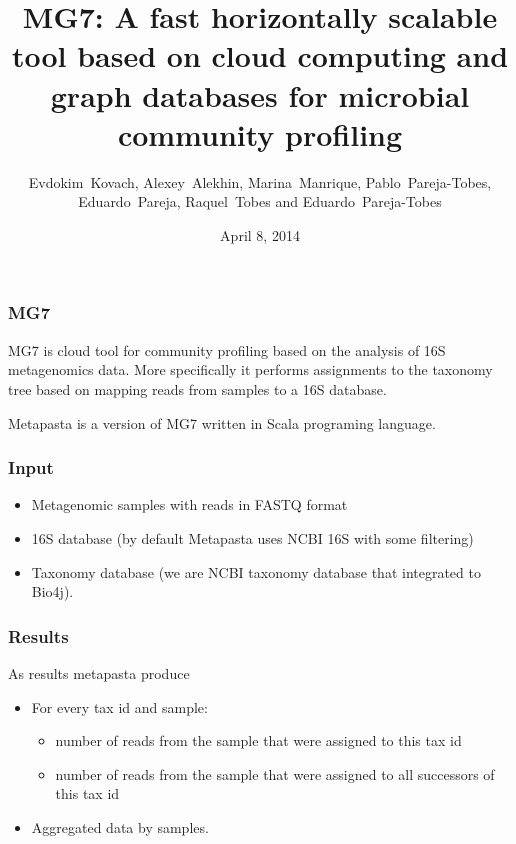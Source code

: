 \documentclass{beamer}
\title[MG7]{MG7: A fast horizontally scalable tool based on
cloud computing and graph databases for
microbial community profiling
} %
\author{Evdokim~Kovach, Alexey~Alekhin, Marina~Manrique, Pablo~Pareja-Tobes, Eduardo~Pareja, Raquel~Tobes and Eduardo~Pareja-Tobes} %
\institute[Era7] %
{
Oh no sequences! Research Group, Era7 bioinformatics
 \\ %
\textit{eparejatobes@ohnosequences.com} %
}
\date{April 8, 2014} %
\begin{document}
\begin{frame}
\titlepage %
\end{frame}



\begin{frame}
\frametitle{MG7}

MG7 is cloud tool for community profiling based on the analysis of 16S metagenomics data.
More specifically it performs assignments to the taxonomy tree based on mapping reads from samples
to a 16S database.

\vspace{1em}

Metapasta is a version of MG7 written in Scala programing language.

\end{frame}

\begin{frame}
\frametitle{Input}
\begin{itemize}
  \item Metagenomic samples with reads in FASTQ format
  \item 16S database (by default Metapasta uses NCBI 16S with some filtering)
  \item Taxonomy database (we are NCBI taxonomy database that integrated to Bio4j).
\end{itemize}
\end{frame}


\begin{frame}
\frametitle{Results}
As results metapasta produce
\begin{itemize}
  \item For every tax id and sample: 
  \begin{itemize}
  	\item number of reads from the sample that were assigned to this tax id
  	\item number of reads from the sample that were assigned to all successors of this tax id
  \end{itemize} 
  \item Aggregated data by samples. 
\end{itemize}
\end{frame}
\end{document}
